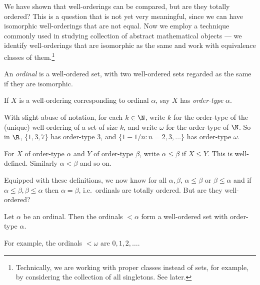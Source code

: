 \documentclass[a4paper]{article}
\begin{document}
We have shown that well-orderings can be compared, but are they totally ordered? This is a question that is not yet very meaningful, since we can have isomorphic well-orderings that are not equal. Now we employ a technique commonly used in studying collection of abstract mathematical objects --- we identify well-orderings that are isomorphic as the same and work with equivalence classes of them.\footnote{Technically, we are working with proper classes instead of sets, for example, by considering the collection of all singletons. See later.}

\begin{definition}[Ordinal]
  An \emph{ordinal} is a well-ordered set, with two well-ordered sets regarded as the same if they are isomorphic.
\end{definition}

\begin{definition}
  If \(X\) is a well-ordering corresponding to ordinal \(\alpha\), say \(X\) has \emph{order-type} \(\alpha\).
\end{definition}

\begin{eg}
  With slight abuse of notation, for each \(k \in \N\), write \(k\) for the order-type of the (unique) well-ordering of a set of size \(k\), and write \(\omega\) for the order-type of \(\N\). So in \(\R\), \(\{1, 3, 7\}\) has order-type \(3\), and \(\{1 - 1/n: n = 2, 3, \dots\}\) has order-type \(\omega\).
\end{eg}

\begin{notation}
  For \(X\) of order-type \(\alpha\) and \(Y\) of order-type \(\beta\), write \(\alpha \leq \beta\) if \(X \leq Y\). This is well-defined. Similarly \(\alpha < \beta\) and so on.
\end{notation}

Equipped with these definitions, we now know for all \(\alpha, \beta\), \(\alpha \leq \beta\) or \(\beta \leq \alpha\) and if \(\alpha \leq \beta, \beta \leq \alpha\) then \(\alpha = \beta\), i.e.\ ordinals are totally ordered. But are they well-ordered?

\begin{theorem}
  Let \(\alpha\) be an ordinal. Then the ordinals \(< \alpha\) form a well-ordered set with order-type \(\alpha\).
\end{theorem}

For example, the ordinals \(< \omega\) are \(0, 1, 2, \dots\).
\end{document}
